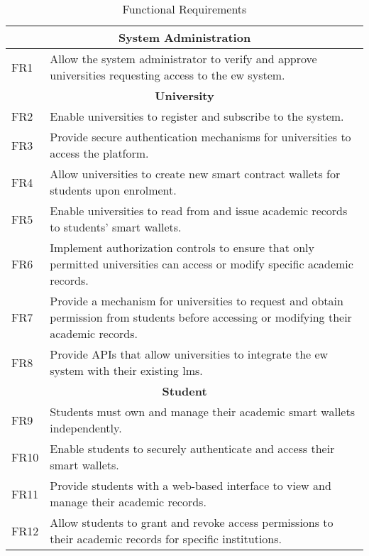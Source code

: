 \begin{table}
\centering
\caption{Functional Requirements}
\label{tab:funcReq}
\begin{tabular}{|p{1.0cm}|p{11cm}|}
\hline
\multicolumn{2}{|c|}{\textbf{System Administration}} \\
\hline
FR1 & Allow the system administrator to verify and approve universities requesting access to the \acrlong{ew} system. \\
\hline
\multicolumn{2}{|c|}{\textbf{University}} \\
\hline
FR2 & Enable universities to register and subscribe to the system. \\
FR3 & Provide secure authentication mechanisms for universities to access the platform. \\
FR4 & Allow universities to create new smart contract wallets for students upon enrolment. \\
FR5 & Enable universities to read from and issue academic records to students' smart wallets. \\
FR6 & Implement authorization controls to ensure that only permitted universities can access or modify specific academic records. \\
FR7 & Provide a mechanism for universities to request and obtain permission from students before accessing or modifying their academic records. \\
FR8 & Provide APIs that allow universities to integrate the \acrlong{ew} system with their existing \acrlong{lms}. \\
\hline
\multicolumn{2}{|c|}{\textbf{Student}} \\
\hline
FR9  & Students must own and manage their academic smart wallets independently. \\
FR10 & Enable students to securely authenticate and access their smart wallets. \\
FR11 & Provide students with a web-based interface to view and manage their academic records. \\
FR12 & Allow students to grant and revoke access permissions to their academic records for specific institutions. \\
\hline
\end{tabular}
\end{table}